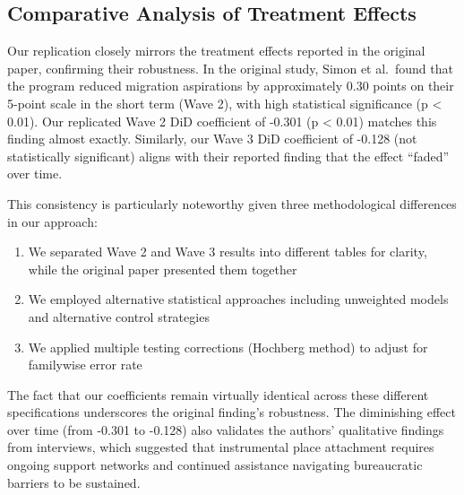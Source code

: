 \documentclass[
]{article}
\providecommand{\tightlist}{%
  \setlength{\itemsep}{0pt}\setlength{\parskip}{0pt}}
\begin{document}
\subsection{Comparative Analysis of Treatment
Effects}\label{comparative-analysis-of-treatment-effects}

Our replication closely mirrors the treatment effects reported in the
original paper, confirming their robustness. In the original study,
Simon et al.~found that the program reduced migration aspirations by
approximately 0.30 points on their 5-point scale in the short term (Wave
2), with high statistical significance (p \textless{} 0.01). Our
replicated Wave 2 DiD coefficient of -0.301 (p \textless{} 0.01) matches
this finding almost exactly. Similarly, our Wave 3 DiD coefficient of
-0.128 (not statistically significant) aligns with their reported
finding that the effect ``faded'' over time.

This consistency is particularly noteworthy given three methodological
differences in our approach:

\begin{enumerate}
\def\labelenumi{\arabic{enumi}.}
\tightlist
\item
  We separated Wave 2 and Wave 3 results into different tables for
  clarity, while the original paper presented them together
\item
  We employed alternative statistical approaches including unweighted
  models and alternative control strategies
\item
  We applied multiple testing corrections (Hochberg method) to adjust
  for familywise error rate
\end{enumerate}

The fact that our coefficients remain virtually identical across these
different specifications underscores the original finding's robustness.
The diminishing effect over time (from -0.301 to -0.128) also validates
the authors' qualitative findings from interviews, which suggested that
instrumental place attachment requires ongoing support networks and
continued assistance navigating bureaucratic barriers to be sustained.
\end{document}
